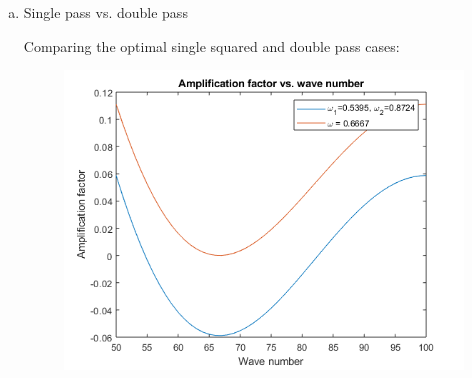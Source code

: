 \documentclass[12pt]{extarticle}
\begin{document}
\begin{enumerate}[(a)]
        \newpage
        \item Single pass vs. double pass
        
        Comparing the optimal single squared and double pass cases:
        
        \begin{figure}[h]
            \centering
            \includegraphics[scale = 0.7]{single_sqr_double.png}
        \end{figure}
        
    \end{enumerate}
\end{document}
